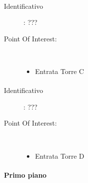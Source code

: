 \documentclass[../SperimentazioniPratiche.tex]{subfiles}
\begin{document}
			\paragraph*{}
			\label{00002}
			\begin{tcolorbox}[fonttitle=\bfseries, 
								adjusted title={\Large Beacon 00002},
								sharp corners=south,
								colback=white, 
								colframe=white!50!blue!75!black]
								
				\begin{description}%
					\item[Identificativo]: ???

					\tcbline					
					
					\item[Point Of Interest:] \ \par
					\begin{itemize}
						\item Entrata Torre C
					\end{itemize}					   				
				\end{description}  				
			\end{tcolorbox}
			
			\paragraph*{}
			\label{00003}
			\begin{tcolorbox}[fonttitle=\bfseries, 
								adjusted title={\Large Beacon 00003},
								sharp corners=south,
								colback=white, 
								colframe=white!50!blue!75!black]
								
				\begin{description}%
					\item[Identificativo]: ???

					\tcbline					
					
					\item[Point Of Interest:] \ \par
					\begin{itemize}
						\item Entrata Torre D
					\end{itemize}					   				
				\end{description}  				
			\end{tcolorbox}
			

			
		\paragraph{Primo piano}			
			
\end{document}
